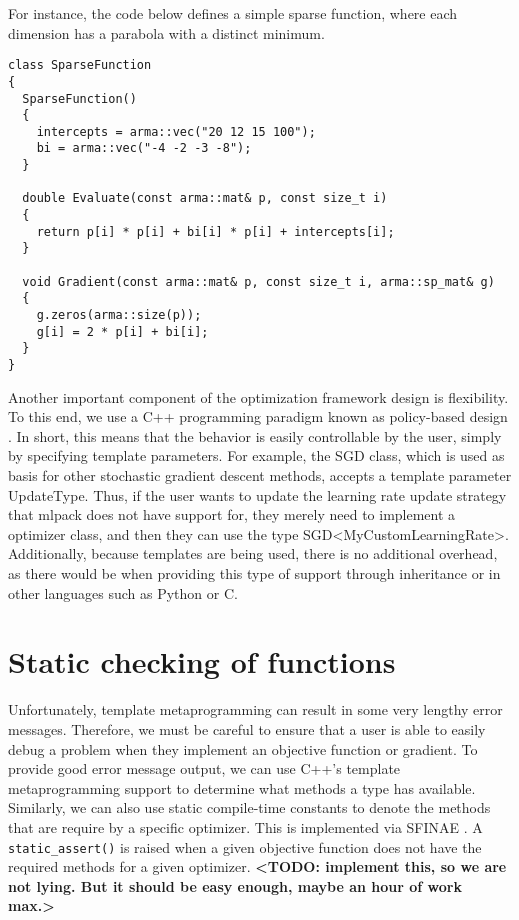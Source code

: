 \documentclass{article}
\begin{document}
{\bf <TODO: add very simple example function>}


For instance, the code below defines a simple sparse function, where each
dimension has a parabola with a distinct minimum.

\begin{verbatim}
class SparseFunction
{
  SparseFunction()
  {
    intercepts = arma::vec("20 12 15 100");
    bi = arma::vec("-4 -2 -3 -8");
  }

  double Evaluate(const arma::mat& p, const size_t i)
  {
    return p[i] * p[i] + bi[i] * p[i] + intercepts[i];
  }

  void Gradient(const arma::mat& p, const size_t i, arma::sp_mat& g)
  {
    g.zeros(arma::size(p));
    g[i] = 2 * p[i] + bi[i];
  }
}
\end{verbatim}

Another important component of the optimization framework design is flexibility.
To this end, we use a C++ programming paradigm known as policy-based design
\cite{Alexandrescu2001}. In short, this means that the behavior is easily
controllable by the user, simply by specifying template parameters. For example,
the SGD class, which is used as basis for other stochastic gradient descent
methods, accepts a template parameter UpdateType. Thus, if the user wants to
update the learning rate update strategy that mlpack does not have support for,
they merely need to implement a optimizer class, and then they can use the type
SGD<MyCustomLearningRate>. Additionally, because templates are being used, there
is no additional overhead, as there would be when providing this type of support
through inheritance or in other languages such as Python or C.

\section{Static checking of functions}

{\bf <TODO: probably a better section title>}

Unfortunately, template metaprogramming can result in some very lengthy error
messages.  Therefore, we must be careful to ensure that a user is able to easily
debug a problem when they implement an objective function or gradient.  To
provide good error message output, we can use C++'s template metaprogramming
support to determine what methods a type has available.  Similarly, we can also
use static compile-time constants to denote the methods that are require by a
specific optimizer.  This is implemented via SFINAE \cite{sfinae}.  A {\tt
static\_assert()} is raised when a given objective function does not have the
required methods for a given optimizer.  {\bf <TODO: implement this, so we are
not lying.  But it should be easy enough, maybe an hour of work max.>}
\end{document}
